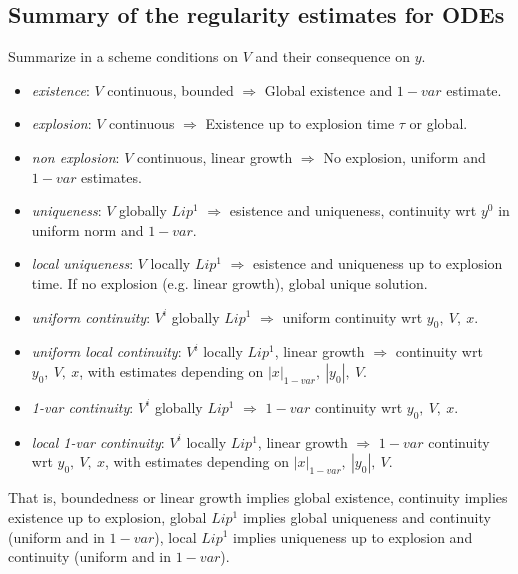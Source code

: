 \subsection{Summary of the regularity estimates for ODEs}
Summarize in a scheme conditions on $V$ and their consequence on $y.$

\begin{itemize}
    \item \textit{existence}: $V$ continuous, bounded $\Rightarrow$ Global existence and $1-var$ estimate.
    \item \textit{explosion}: $V$ continuous $\Rightarrow$ Existence up to explosion time $\tau$ or global.
    \item \textit{non explosion}: $V$ continuous, linear growth $\Rightarrow$ No explosion, uniform and $1-var$ estimates.
    \item \textit{uniqueness}: $V$ globally $Lip^1$ $\Rightarrow$ esistence and uniqueness, continuity wrt $y^0$ in uniform norm and $1-var.$
    \item \textit{local uniqueness}: $V$ locally $Lip^1$ $\Rightarrow$ esistence and uniqueness up to explosion time. If no explosion (e.g. linear growth), global unique solution.
    \item \textit{uniform continuity}: $V^i$ globally $Lip^1$ $\Rightarrow$ uniform continuity wrt $y_0,\ V,\ x$.
    \item \textit{uniform local continuity}: $V^i$ locally $Lip^1$, linear growth $\Rightarrow$ continuity wrt $y_0,\ V,\ x$, with estimates depending on $|x|_{1-var},\ |y_0|,\ V.$
    \item \textit{1-var continuity}: $V^i$ globally $Lip^1$ $\Rightarrow$ $1-var$ continuity wrt $y_0,\ V,\ x$.
    \item \textit{local 1-var continuity}: $V^i$ locally $Lip^1$, linear growth $\Rightarrow$ $1-var$ continuity wrt $y_0,\ V,\ x$, with estimates depending on $|x|_{1-var},\ |y_0|,\ V.$
\end{itemize}

That is, boundedness or linear growth implies global existence, continuity implies existence up to explosion, global $Lip^1$ implies global uniqueness and continuity (uniform and in $1-var$), local $Lip^1$ implies uniqueness up to explosion and continuity (uniform and in $1-var$).

